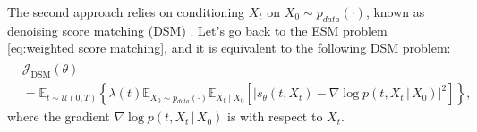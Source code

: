 \documentclass[letterpaper,11pt,reqno]{amsart}
\numberwithin{equation}{section}
\begin{document}
The second approach relies on 
conditioning $X_t$ on $X_0 \sim p_{data}(\cdot)$,
known as denoising score matching (DSM) \cite{Hyv05, Vi11}.
Let's go back to the ESM problem \eqref{eq:weighted score matching},
and it is equivalent to the following DSM problem:
\begin{equation}
\label{eq:tildeDSM}
\begin{aligned}
&\tilde{\mathcal{J}}_{\text{DSM}}(\theta) \\
&=\mathbb{E}_{t\sim\mathcal{U}(0, T)}\left\{\lambda(t) \mathbb{E}_{X_0\sim p_{data}(\cdot)} \mathbb{E}_{X_t \mid X_0}\left[\left|s_{\theta}(t,X_t)- \nabla \log p(t,X_t \,|\, X_0)\right|^2\right]\right\},
\end{aligned}
\end{equation}
where the gradient $\nabla \log p(t,X_t \,|\, X_0)$ is with respect to $X_t$.
\end{document}

